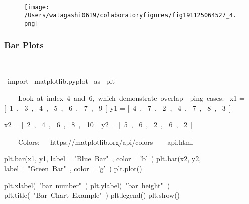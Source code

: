 \begin{paracol}{2}
\begin{cellExecute}[escapechar=~]
~~
\end{cellExecute}
\switchcolumn
\begin{resultCell}[escapechar=~]
\end{resultCell}
\end{paracol}

\begin{figure}[H]
\centering
\texttt{[image: /Users/watagashi0619/colaboratoryfigures/fig191125064527\_4.png]}
\end{figure}
\subsubsection{Bar Plots}

\begin{paracol}{2}
\smallskip
\begin{cellExecute}[escapechar=~]
~~
\end{cellExecute}
\switchcolumn
\begin{codeCell}[escapechar=~]
~\textcolor{mtk17}{import}~ matplotlib.pyplot ~\textcolor{mtk17}{as}~ plt

~~~\textcolor{mtk8}{ Look at index 4 and 6, which demonstrate overlap}~~\textcolor{mtk8}{ping cases.}~
x1 = [~\textcolor{mtk7}{1}~, ~\textcolor{mtk7}{3}~, ~\textcolor{mtk7}{4}~, ~\textcolor{mtk7}{5}~, ~\textcolor{mtk7}{6}~, ~\textcolor{mtk7}{7}~, ~\textcolor{mtk7}{9}~]
y1 = [~\textcolor{mtk7}{4}~, ~\textcolor{mtk7}{7}~, ~\textcolor{mtk7}{2}~, ~\textcolor{mtk7}{4}~, ~\textcolor{mtk7}{7}~, ~\textcolor{mtk7}{8}~, ~\textcolor{mtk7}{3}~]

x2 = [~\textcolor{mtk7}{2}~, ~\textcolor{mtk7}{4}~, ~\textcolor{mtk7}{6}~, ~\textcolor{mtk7}{8}~, ~\textcolor{mtk7}{10}~]
y2 = [~\textcolor{mtk7}{5}~, ~\textcolor{mtk7}{6}~, ~\textcolor{mtk7}{2}~, ~\textcolor{mtk7}{6}~, ~\textcolor{mtk7}{2}~]

~~~\textcolor{mtk8}{ Colors: }~~\textcolor{mtk8}{https://matplotlib.org/api/colors}~~~~\textcolor{mtk8}{api.html}~

plt.bar(x1, y1, label=~\textcolor{mtk25}{"Blue Bar"}~, color=~\textcolor{mtk25}{'b'}~)
plt.bar(x2, y2, label=~\textcolor{mtk25}{"Green Bar"}~, color=~\textcolor{mtk25}{'g'}~)
plt.plot()

plt.xlabel(~\textcolor{mtk25}{"bar number"}~)
plt.ylabel(~\textcolor{mtk25}{"bar height"}~)
plt.title(~\textcolor{mtk25}{"Bar Chart Example"}~)
plt.legend()
plt.show()
\end{codeCell}
\end{paracol}

